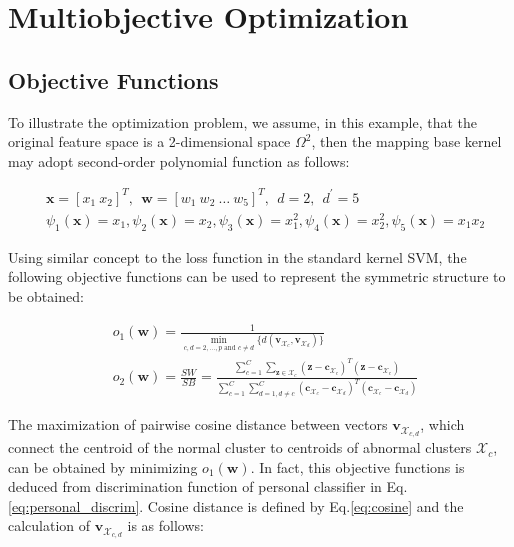 \section{Multiobjective Optimization}

\subsection{Objective Functions}

To illustrate the optimization problem, we assume, in this example, that the original feature space is a 2-dimensional space $\Omega^2$, then the mapping base kernel may adopt second-order polynomial function as follows:

\begin{align}
\nonumber
&\mathbf{x}=[x_1~ x_2]^T,~~ \mathbf{w}=[w_1~ w_2~ \dots~ w_5]^T,~~d=2, ~~d^\prime=5\\
&\psi_1(\mathbf{x})=x_1, \psi_2(\mathbf{x})=x_2, \psi_3(\mathbf{x})=x_1^2, \psi_4(\mathbf{x})=x_2^2, \psi_5(\mathbf{x})=x_1x_2
\label{eq5}
\end{align}

Using similar concept to the loss function in the standard kernel SVM, the following objective functions can be used to represent the symmetric structure to be obtained:

\begin{align}
\label{eq:obj}
&o_1(\mathbf{w}) = \frac{1}{\underset{c,d=2,\dots,p \text{ and } c\neq d }{\min}\{d(\mathbf{v}_{\mathcal{X}_c},\mathbf{v}_{\mathcal{X}_d})\}} \\ %
\nonumber 
&o_2(\mathbf{w}) = \frac{SW}{SB}=\frac{\sum_{c=1}^{C}  \sum_{\mathbf{z} \in \mathcal{X}_c}   (\mathbf{z}-\mathbf{c}_{\mathcal{X}_c})^T(\mathbf{z}-\mathbf{c}_{\mathcal{X}_c})}{\sum_{c=1}^{C}\sum_{d=1, d\neq c}^{C}  (\mathbf{c}_{\mathcal{X}_c}-\mathbf{c}_{\mathcal{X}_d})^T(\mathbf{c}_{\mathcal{X}_c}-\mathbf{c}_{\mathcal{X}_d}) }
\end{align}

The maximization of pairwise cosine distance between vectors $\mathbf{v}_{\mathcal{X}_{c,d}}$, which connect the centroid of the normal cluster to centroids of abnormal clusters $\mathcal{X}_c$, can be obtained by minimizing $o_1(\mathbf{w})$. In fact, this objective functions is deduced from discrimination function of personal classifier in Eq.\ref{eq:personal_discrim}. Cosine distance is defined by Eq.\ref{eq:cosine} and the calculation of $\mathbf{v}_{\mathcal{X}_{c,d}}$ is as follows: %

